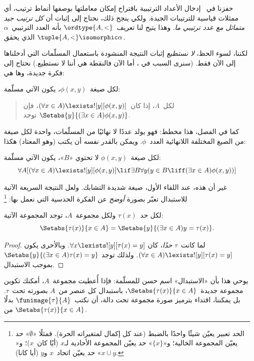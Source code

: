 \documentclass[../../../include/open-logic-section]{subfiles}
\begin{document}

حفزنا في~ إدخال الأعداد الترتيبية
باقتراح إمكان معاملتها بوصفها أنماط ترتيب، أي ممثلات قياسية للترتيبات
الجيدة. ولكي ينجح ذلك، نحتاج إلى إثبات أن \emph{كل ترتيب جيد متماثل
مع عدد ترتيبي ما}. وهذا يتيح لنا تعريف~$\ordtype{A, <}$ بأنه العدد
الترتيبي~$\alpha$ الذي يحقق
$\tuple{A, <} \isomorphic \alpha$.

لكننا، لسوء الحظ، \emph{لا نستطيع} إثبات النتيجة المنشودة باستعمال
المسلّمات التي أدخلناها إلى الآن فقط. (سنرى السبب في
، أما الآن فالنقطة هي أننا لا نستطيع.)
نحتاج إلى فكرة جديدة، وها هي:

\begin{axiom}
لكل صيغة~$\phi(x, y)$، يكون الآتي مسلّمة:
\begin{quote}
	لكل~$A$، إذا كان~$(\forall x \in A)\lexists![y][\phi(x,y)]$، فإن
	$\Setabs{y}{(\exists x \in A)\phi(x,y)}$ توجد.
\end{quote}
\end{axiom}
\noindent
كما في الفصل، هذا مخطط: فهو يولد عددًا لا نهائيًا من المسلّمات، واحدة
لكل صيغة من الصيغ المختلفة اللانهائية العدد~$\phi$. ويمكن بالقدر نفسه
أن يكتب (وهو المعتاد) هكذا:

\begin{defish}
لكل صيغة~$\phi(x,y)$ لا تحتوي «$B$»، يكون الآتي مسلّمة:
\[
\forall A[(\forall x \in A)\lexists![y][\phi(x,y)] \lif
\exists B\forall y (y \in B \liff (\exists x \in A)\phi(x,y))]
\]
\end{defish}

غير أن هذه، عند اللقاء الأول، صيغة شديدة التشابك. ولعل النتيجة السريعة
الآتية للاستبدال تعبّر بصورة \emph{أوضح} عن الفكرة الحدسية التي نعمل
بها:
\footnote{الحد تعبير يعيّن شيئًا واحدًا بالضبط (عند كل إكمال لمتغيراته
  الحرة). فمثلًا «$\emptyset$» حد يعيّن المجموعة الخالية؛ و«$\{x\}$»
  حد يعيّن المجموعة الأحادية لـ$x$ (أيًا كان~$x$)؛ و«$x \cup y$» حد
  يعيّن اتحاد~$x$ و$y$ (أيا كانا).}

\begin{cor}
لكل حد~$\tau(x)$ ولكل مجموعة~$A$، توجد المجموعة الآتية:
\[
	\Setabs{\tau(x)}{x \in A} = \Setabs{y}{(\exists x \in A)y = \tau(x)}.
\]
\end{cor}

\begin{proof}
لما كانت~$\tau$ \emph{حدًا}، كان
$\forall x \lexists![y][\tau(x) = y]$. وبالأحرى يكون
$(\forall x \in A)\lexists![y][\tau(x) = y]$. ولذلك توجد
$\Setabs{y}{(\exists x \in A)\tau(x) = y}$ بموجب الاستبدال.
\end{proof}
\noindent
يوحي هذا بأن «الاستبدال» اسم حسن للمسلّمة: فإذا أُعطيت مجموعة~$A$،
أمكنك تكوين مجموعة جديدة~$\Setabs{\tau(x)}{x \in A}$، باستبدال كل
عنصر من~$A$ بصورته تحت~$\tau$. بل يمكننا، اقتداء بترميز صورة مجموعة
تحت دالة، أن نكتب~$\funimage{\tau}{A}$ بدلًا من
$\Setabs{\tau(x)}{x \in A}$.
\end{document}
